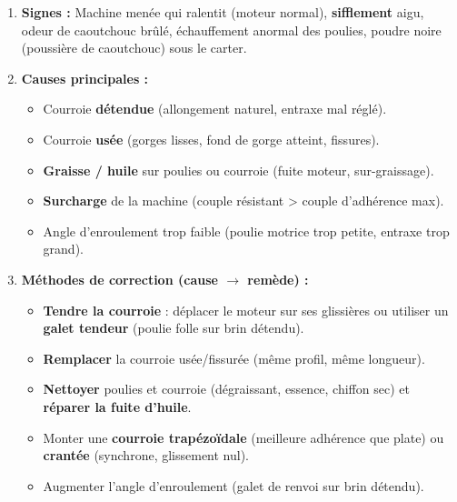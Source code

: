\documentclass[11pt]{article}
\begin{document}
\begin{methode}
\begin{enumerate}
\item \textbf{Signes :} Machine menée qui ralentit (moteur normal), \textbf{sifflement} aigu, odeur de caoutchouc brûlé, échauffement anormal des poulies, poudre noire (poussière de caoutchouc) sous le carter.
\item \textbf{Causes principales :}
\begin{itemize}
\item Courroie \textbf{détendue} (allongement naturel, entraxe mal réglé).
\item Courroie \textbf{usée} (gorges lisses, fond de gorge atteint, fissures).
\item \textbf{Graisse / huile} sur poulies ou courroie (fuite moteur, sur-graissage).
\item \textbf{Surcharge} de la machine (couple résistant > couple d'adhérence max).
\item Angle d'enroulement trop faible (poulie motrice trop petite, entraxe trop grand).
\end{itemize}
\item \textbf{Méthodes de correction (cause $\rightarrow$ remède) :}
\begin{itemize}
\item \textbf{Tendre la courroie} : déplacer le moteur sur ses glissières ou utiliser un \textbf{galet tendeur} (poulie folle sur brin détendu).
\item \textbf{Remplacer} la courroie usée/fissurée (même profil, même longueur).
\item \textbf{Nettoyer} poulies et courroie (dégraissant, essence, chiffon sec) et \textbf{réparer la fuite d'huile}.
\item Monter une \textbf{courroie trapézoïdale} (meilleure adhérence que plate) ou \textbf{crantée} (synchrone, glissement nul).
\item Augmenter l'angle d'enroulement (galet de renvoi sur brin détendu).
\end{itemize}
\end{enumerate}
\end{methode}
\end{document}
